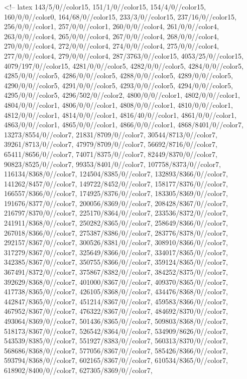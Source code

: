 <!-- latex
{143/5/0//color15,
151/1/0//color15,
154/4/0//color15,
160/0/0//color0,
164/68/0//color15,
233/3/0//color15,
237/16/0//color15,
256/0/0//color1,
257/0/0//color1,
260/0/0//color4,
261/0/0//color4,
263/0/0//color4,
265/0/0//color4,
267/0/0//color4,
268/0/0//color4,
270/0/0//color4,
272/0/0//color4,
274/0/0//color4,
275/0/0//color4,
277/0/0//color4,
279/0/0//color4,
287/3763/0//color15,
4053/25/0//color15,
4079/197/0//color15,
4281/0/0//color5,
4282/0/0//color5,
4284/0/0//color5,
4285/0/0//color5,
4286/0/0//color5,
4288/0/0//color5,
4289/0/0//color5,
4290/0/0//color5,
4291/0/0//color5,
4293/0/0//color5,
4294/0/0//color5,
4295/0/0//color5,
4296/502/0//color2,
4800/0/0//color1,
4802/0/0//color1,
4804/0/0//color1,
4806/0/0//color1,
4808/0/0//color1,
4810/0/0//color1,
4812/0/0//color1,
4814/0/0//color1,
4816/40/0//color1,
4861/0/0//color1,
4863/0/0//color1,
4865/0/0//color1,
4866/0/0//color1,
4868/8401/0//color7,
13273/8554/0//color7,
21831/8709/0//color7,
30544/8713/0//color7,
39261/8713/0//color7,
47979/8709/0//color7,
56692/8716/0//color7,
65411/8656/0//color7,
74071/8375/0//color7,
82449/8370/0//color7,
90823/8525/0//color7,
99353/8401/0//color7,
107758/8373/0//color7,
116134/8368/0//color7,
124504/8385/0//color7,
132893/8366/0//color7,
141262/8457/0//color7,
149722/8452/0//color7,
158177/8376/0//color7,
166557/8366/0//color7,
174925/8376/0//color7,
183305/8369/0//color7,
191676/8377/0//color7,
200056/8369/0//color7,
208428/8367/0//color7,
216797/8370/0//color7,
225170/8364/0//color7,
233536/8372/0//color7,
241911/8368/0//color7,
250282/8365/0//color7,
258649/8366/0//color7,
267018/8366/0//color7,
275387/8386/0//color7,
283776/8378/0//color7,
292157/8367/0//color7,
300526/8381/0//color7,
308910/8366/0//color7,
317279/8367/0//color7,
325649/8366/0//color7,
334017/8365/0//color7,
342385/8367/0//color7,
350755/8366/0//color7,
359124/8365/0//color7,
367491/8372/0//color7,
375867/8382/0//color7,
384252/8375/0//color7,
392629/8368/0//color7,
401000/8367/0//color7,
409370/8365/0//color7,
417738/8365/0//color7,
426105/8368/0//color7,
434476/8368/0//color7,
442847/8365/0//color7,
451214/8367/0//color7,
459583/8366/0//color7,
467952/8367/0//color7,
476322/8367/0//color7,
484692/8370/0//color7,
493064/8369/0//color7,
501436/8365/0//color7,
509803/8368/0//color7,
518173/8367/0//color7,
526542/8364/0//color7,
534909/8626/0//color7,
543539/8385/0//color7,
551927/8383/0//color7,
560313/8370/0//color7,
568686/8368/0//color7,
577056/8367/0//color7,
585426/8366/0//color7,
593794/8368/0//color7,
602165/8367/0//color7,
610534/8365/0//color7,
618902/8400/0//color7,
627305/8369/0//color7,
}
